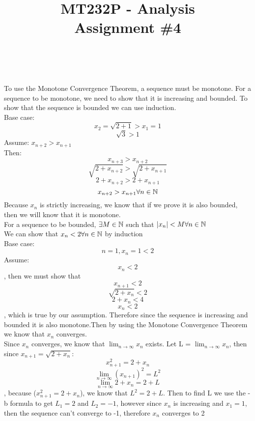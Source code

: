 \documentclass{article}
\title{
    \vspace{2in}
        \textmd{\textbf{MT232P - Analysis}}\\
    \vspace{1in}
    \textmd{\textbf{Assignment \#4}}\\
    \vspace{1in}
}
\author{
    \hmwkAuthorName\\
    \hmwkStudentnum
}
\date{}
\begin{document}
\maketitle

\pagebreak

\begin{homeworkProblem}
    \solution
    To use the Monotone Convergence Theorem, a sequence must be monotone. For a sequence to be monotone, we need to show that it is increasing and bounded. To show that the sequence is bounded we can use induction.\\Base case: $$x_2 = \sqrt{2+1} > x_1 = 1$$ $$\sqrt{3} > 1$$ Assume: $x_{n + 2} > x_{n + 1}$\\Then: $$x_{n+3} > x_{n+2}$$ $$\sqrt{2 + x_{n + 2}} > \sqrt{2 + x_{n + 1}}$$ $$2 + x_{n + 2} > 2 + x_{n + 1}$$ $$x_{n + 2} > x_{n + 1} \forall n \in \mathbb{N}$$ Because ${x_n}$ is strictly increasing, we know that if we prove it is also bounded, then we will know that it is monotone.\\ For a sequence to be bounded, $\exists M \in \mathbb{N}$ such that $|x_n| < M \forall n \in \mathbb{N}$\\ We can show that $x_n < 2 \forall n \in \mathbb{N}$ by induction\\Base case: $$n = 1, x_n = 1 < 2$$Assume: $$x_n <2$$, then we must show that $$x_{n+1} < 2$$ $$\sqrt{2 + x_n} < 2$$ $$2 + x_n < 4$$ $$x_n < 2$$, which is true by our assumption. Therefore since the sequence is increasing and bounded it is also monotone.Then by using the Monotone Convergence Theorem we know that ${x_n}$ converges.\\ Since ${x_n}$ converges, we know that $\lim_{n \to \infty}{x_n}$ exists.
    Let L = $\lim_{n \to \infty}{x_n}$, then since $x_{n+1} = \sqrt{2 + x_n}$: $$x_{n+1}^2 = 2 + x_n$$ $$\lim_{n \to \infty}{(x_{n + 1})}^2 = L^2$$ $$\lim_{n \to \infty}{2 + x_n} = 2 + L$$, because ($x_{n + 1}^2 = 2 + x_n$), we know that $L^2 = 2 + L$. Then to find L we use the -b formula to get $L_1 = 2$ and $L_2 = -1$, however since ${x_n}$ is increasing and $x_1 = 1$, then the sequence can't converge to -1, therefore ${x_n}$ converges to 2
\end{homeworkProblem}
\end{document}

